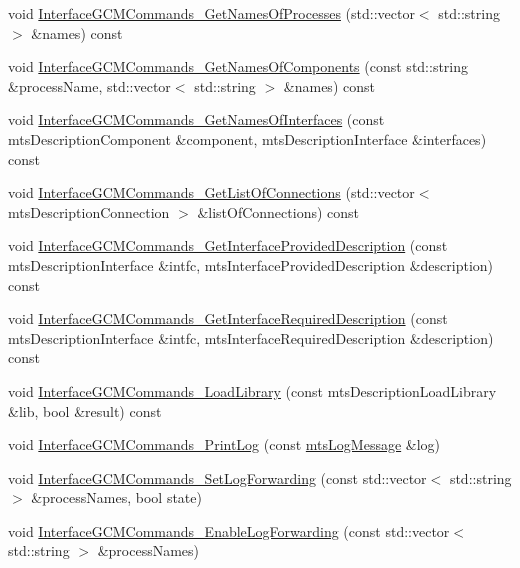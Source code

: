 \begin{DoxyCompactItemize}
\item 
void \hyperlink{classmts_manager_component_server_a82166415703899c3a250869bf8adbd59}{Interface\+G\+C\+M\+Commands\+\_\+\+Get\+Names\+Of\+Processes} (std\+::vector$<$ std\+::string $>$ \&names) const 
\item 
void \hyperlink{classmts_manager_component_server_abd512edd1f98f42ada757d78a113e57a}{Interface\+G\+C\+M\+Commands\+\_\+\+Get\+Names\+Of\+Components} (const std\+::string \&process\+Name, std\+::vector$<$ std\+::string $>$ \&names) const 
\item 
void \hyperlink{classmts_manager_component_server_ac67fcc9dd6ecc7205a783e2b5d31709c}{Interface\+G\+C\+M\+Commands\+\_\+\+Get\+Names\+Of\+Interfaces} (const mts\+Description\+Component \&component, mts\+Description\+Interface \&interfaces) const 
\item 
void \hyperlink{classmts_manager_component_server_a343cbce6cf3d4e2af99e95af0ef0a9d7}{Interface\+G\+C\+M\+Commands\+\_\+\+Get\+List\+Of\+Connections} (std\+::vector$<$ mts\+Description\+Connection $>$ \&list\+Of\+Connections) const 
\item 
void \hyperlink{classmts_manager_component_server_a28987b940123ebebf65ede751021a6ec}{Interface\+G\+C\+M\+Commands\+\_\+\+Get\+Interface\+Provided\+Description} (const mts\+Description\+Interface \&intfc, mts\+Interface\+Provided\+Description \&description) const 
\item 
void \hyperlink{classmts_manager_component_server_a44e58ed09a6b9c7b2caa977923ca9b1a}{Interface\+G\+C\+M\+Commands\+\_\+\+Get\+Interface\+Required\+Description} (const mts\+Description\+Interface \&intfc, mts\+Interface\+Required\+Description \&description) const 
\item 
void \hyperlink{classmts_manager_component_server_a973ef27b54522196c93567c11a4f4bf9}{Interface\+G\+C\+M\+Commands\+\_\+\+Load\+Library} (const mts\+Description\+Load\+Library \&lib, bool \&result) const 
\item 
void \hyperlink{classmts_manager_component_server_ab839a8bfcec131ad95a3211c81189913}{Interface\+G\+C\+M\+Commands\+\_\+\+Print\+Log} (const \hyperlink{classmts_log_message}{mts\+Log\+Message} \&log)
\item 
void \hyperlink{classmts_manager_component_server_ae577ba00e3227d38951469ee52a94bb9}{Interface\+G\+C\+M\+Commands\+\_\+\+Set\+Log\+Forwarding} (const std\+::vector$<$ std\+::string $>$ \&process\+Names, bool state)
\item 
void \hyperlink{classmts_manager_component_server_a1019aae9f1b57584d6bd6aebaf04f46b}{Interface\+G\+C\+M\+Commands\+\_\+\+Enable\+Log\+Forwarding} (const std\+::vector$<$ std\+::string $>$ \&process\+Names)

\end{DoxyCompactItemize}
